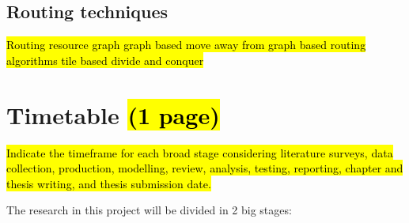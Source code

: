 \documentclass[a4paper,oneside,12pt]{article}
\begin{document}
\subsection{Routing techniques}\label{routetech}

\hl{Routing resource graph
graph based
move away from graph based routing algorithms
tile based
divide and conquer}

\newpage

\section{Timetable \hl{(1 page)}}\label{timetable}
\hl{ Indicate the timeframe for each broad stage considering literature surveys, data collection, production, modelling, review, analysis,
testing, reporting, chapter and thesis writing, and thesis submission date.}

The research in this project will be divided in 2 big stages:
\end{document}
